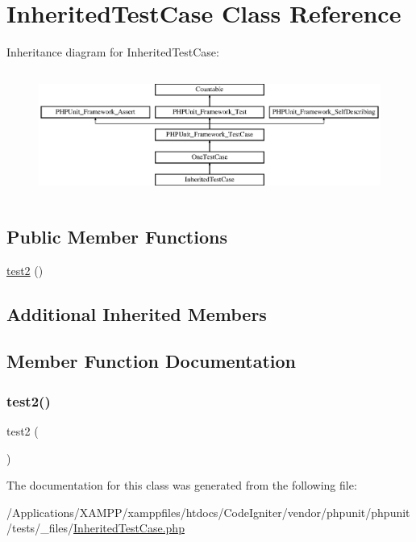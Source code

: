 \hypertarget{class_inherited_test_case}{}\section{Inherited\+Test\+Case Class Reference}
\label{class_inherited_test_case}
Inheritance diagram for Inherited\+Test\+Case\+:\begin{figure}[H]
\begin{center}
\leavevmode
\includegraphics[height=4.129793cm]{class_inherited_test_case}
\end{center}
\end{figure}
\subsection*{Public Member Functions}
\begin{DoxyCompactItemize}
\item 
\mbox{\hyperlink{class_inherited_test_case_ac1e2d86a33f7b563e1d5e317974d9074}{test2}} ()
\end{DoxyCompactItemize}
\subsection*{Additional Inherited Members}


\subsection{Member Function Documentation}
\mbox{\label{class_inherited_test_case_ac1e2d86a33f7b563e1d5e317974d9074}} 
\subsubsection{\texorpdfstring{test2()}{test2()}}
{\footnotesize\ttfamily test2 (\begin{DoxyParamCaption}{ }\end{DoxyParamCaption})}



The documentation for this class was generated from the following file\+:\begin{DoxyCompactItemize}
\item 
/\+Applications/\+X\+A\+M\+P\+P/xamppfiles/htdocs/\+Code\+Igniter/vendor/phpunit/phpunit/tests/\+\_\+files/\mbox{\hyperlink{_inherited_test_case_8php}{Inherited\+Test\+Case.\+php}}\end{DoxyCompactItemize}
